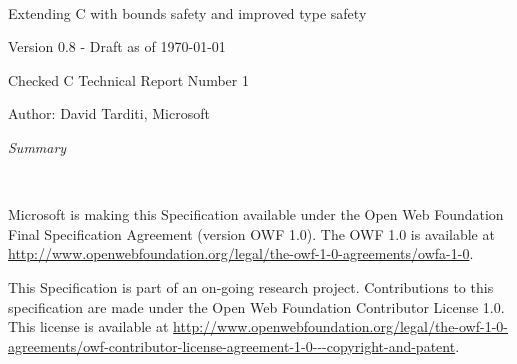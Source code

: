 \documentclass[11pt]{report}
\begin{document}
\begin{titlepage}
{\center
\mbox{ }\\
\vspace{1in}
{\huge Extending C with bounds safety and improved type safety\par}
{Version 0.8 - Draft as of \today \par}
\vspace{0.25in}
{Checked C Technical Report Number 1 \par}
\vspace{0.125in}
{Author: David Tarditi, Microsoft\par}
\vspace{0.5in}
{\it Summary \par}

}
\end{titlepage}

\thispagestyle{empty}
\mbox{  }\\
\vspace{1.0in}

Microsoft is making this Specification available under the Open Web
Foundation Final Specification Agreement (version OWF 1.0).  The OWF 1.0
is available at {\color{blue} \url{http://www.openwebfoundation.org/legal/the-owf-1-0-agreements/owfa-1-0}}.

This Specification is part of an on-going research project.
Contributions to this specification
are made under the Open Web Foundation Contributor License 1.0.
This license is available at {\color{blue} \url{http://www.openwebfoundation.org/legal/the-owf-1-0-agreements/owf-contributor-license-agreement-1-0---copyright-and-patent}}.

\newpage

\setcounter{page}{1}

\tableofcontents

\setcounter{page}{1}













\nocite{Jones2009}
\nocite{Jim2002}



\appendix
% 
% 
\end{document}
